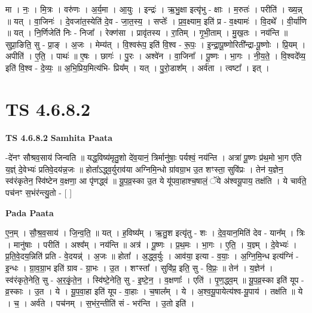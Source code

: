 \documentclass[17pt]{extarticle}
\begin{document}
मा । नः॒ । मि॒त्रः । वरु॑णः । अ॒र्य॒मा । आ॒युः । इन्द्रः॑ । ऋ॒भु॒क्षा इत्यृ॑भु - क्षाः । म॒रुतः॑ । परीति॑ । ख्य॒न्न् ॥ यत् । वा॒जिनः॑ । दे॒वजा॑त॒स्येति॑ दे॒व - जा॒त॒स्य॒ । सप्तेः᳚ । प्र॒व॒क्ष्याम॒ इति॑ प्र - व॒क्ष्यामः॑ । वि॒दथे᳚ । वी॒र्या॑णि ॥ यत् । नि॒र्णिजेति॑ निः - निजा᳚ । रेक्ण॑सा । प्रावृ॑तस्य । रा॒तिम् । गृ॒भी॒ताम् । मु॒ख॒तः । नय॑न्ति ॥ सुप्रा॒ङिति॒ सु - प्रा॒ङ् । अ॒जः । मेम्य॑त् । वि॒श्वरू॑प॒ इति॑ वि॒श्व - रू॒पः॒ । इ॒न्द्रा॒पू॒ष्णोरिती᳚न्द्रा-पू॒ष्णोः । प्रि॒यम् । अपीति॑ । ए॒ति॒ । पाथः॑ ॥ ए॒षः । छागः॑ । पु॒रः । अश्वे॑न । वा॒जिना᳚ । पू॒ष्णः । भा॒गः । नी॒य॒ते॒ । वि॒श्वदे᳚व्य॒ इति॑ वि॒श्व - दे॒व्यः॒ ॥ अ॒भि॒प्रिय॒मित्य॑भि- प्रिय᳚म् । यत् । पु॒रो॒डाश᳚म् । अर्व॑ता । त्वष्टा᳚ । इत् ।  \newline





\section{ TS 4.6.8.2 }

\textbf{TS 4.6.8.2 } \newline
\textbf{Samhita Paata} \newline

-दे॑नꣳ सौश्रव॒साय॑ जिन्वति ॥ यद्ध॒विष्य॑मृतु॒शो दे॑व॒यानं॒ त्रिर्मानु॑षाः॒ पर्यश्वं॒ नय॑न्ति । अत्रा॑ पू॒ष्णः प्र॑थ॒मो भा॒ग ए॑ति य॒ज्ञ्ं दे॒वेभ्यः॑ प्रतिवे॒दय॑न्न॒जः ॥ होता᳚ऽद्ध्व॒र्युराव॑या अग्निमि॒न्धो ग्रा॑वग्रा॒भ उ॒त शꣳस्ता॒ सुवि॑प्रः । तेन॑ य॒ज्ञेन॒ स्व॑रंकृतेन॒ स्वि॑ष्टेन व॒क्षणा॒ आ पृ॑णद्ध्वं ॥ यू॒प॒व्र॒स्का उ॒त ये यू॑पवा॒हाश्च॒षालं॒ ॅये अ॑श्वयू॒पाय॒ तक्ष॑ति । ये चार्व॑ते॒ पच॑नꣳ स॒भंर॑न्त्यु॒तो - [  ] \newline

\textbf{Pada Paata} \newline

ए॒न॒म् । सौ॒श्र॒व॒साय॑ । जि॒न्व॒ति॒ ॥ यत् । ह॒विष्य᳚म् । ऋ॒तु॒श इत्यृ॑तु - शः । दे॒व॒यान॒मिति॑ देव - यान᳚म् । त्रिः । मानु॑षाः । परीति॑ । अश्व᳚म् । नय॑न्ति ॥ अत्र॑ । पू॒ष्णः । प्र॒थ॒मः । भा॒गः । ए॒ति॒ । य॒ज्ञ्म् । दे॒वेभ्यः॑ । प्र॒ति॒वे॒दय॒न्निति॑ प्रति - वे॒दयन्न्॑ । अ॒जः ॥ होता᳚ । अ॒द्ध्व॒र्युः । आव॑या॒ इत्या - व॒याः॒ । अ॒ग्नि॒मि॒न्ध इत्य॑ग्निं - इ॒न्धः । ग्रा॒व॒ग्रा॒भ इति॑ ग्राव - ग्रा॒भः । उ॒त । शꣳस्ता᳚ । सुवि॑प्र॒ इति॒ सु - वि॒प्रः॒ ॥ तेन॑ । य॒ज्ञेन॑ । स्व॑रंकृते॒नेति॒ सु - अ॒र॒कृं॒ते॒न॒ । स्वि॑ष्टे॒नेति॒ सु - इ॒ष्टे॒न॒ । व॒क्षणाः᳚ । एति॑ । पृ॒ण॒द्ध्व॒म् ॥ यू॒प॒व्र॒स्का इति॑ यूप - व्र॒स्काः । उ॒त । ये । यू॒प॒वा॒हा इति॑ यूप - वा॒हाः । च॒षाल᳚म् । ये । अ॒श्व॒यू॒पायेत्य॑श्व-यू॒पाय॑ । तक्ष॑ति ॥ ये । च॒ । अर्व॑ते । पच॑नम् । स॒भंर॒न्तीति॑ सं - भर॑न्ति । उ॒तो इति॑ ।  \newline
\end{document}
